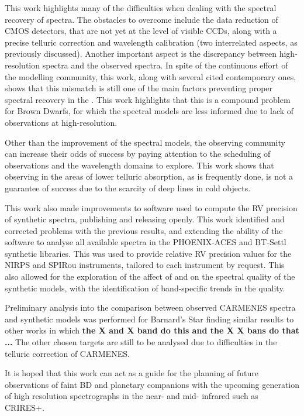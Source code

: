 This work highlights many of the difficulties when dealing with the spectral recovery of \nir{} spectra.
The obstacles to overcome include the data reduction of \nir{} CMOS detectors, that are not yet at the level of visible CCDs, along with a precise telluric correction and wavelength calibration (two interrelated aspects, as previously discussed).
Another important aspect is the discrepancy between \nir{} high-resolution spectra and the observed spectra.
In spite of the continuous effort of the modelling community, this work, along with several cited contemporary ones, shows that this mismatch is still one of the main factors preventing proper spectral recovery in the \nir{}.
This work highlights that this is a compound problem for Brown Dwarfs, for which the spectral models are less informed due to lack of observations at high-resolution.

Other than the improvement of the spectral models, the observing community can increase their odds of success by paying attention to the scheduling of observations and the wavelength domains to explore.
This work shows that observing in the areas of lower telluric absorption, as is frequently done, is not a guarantee of success due to the scarcity of deep lines in cold objects.

This work also made improvements to software used to compute the {RV} precision of synthetic spectra, publishing and releasing \eniric{} openly.
This work identified and corrected problems with the previous results, and extending the ability of the software to analyse all available spectra in the {PHOENIX-ACES} and {BT-Settl} synthetic libraries.
This was used to provide relative {RV} precision values for the {NIRPS} and {SPIRou} instruments, tailored to each instrument by request.
This also allowed for the exploration of the affect of \Logg and \feh{} on the spectral quality of the synthetic models, with the identification of band-specific trends in the quality.

Preliminary analysis into the comparison between observed {CARMENES} spectra and synthetic models was performed for Barnard's Star finding similar results to other works in which \textbf{the X and X band do this and the X X bans do that ...}\todo{} The other chosen targets are still to be analysed due to difficulties in the telluric correction of {CARMENES}.

It is hoped that this work can act as a guide for the planning of future observations of faint {BD} and planetary companions with the upcoming generation of high resolution spectrographs in the near- and mid- infrared such as CRIRES+.


